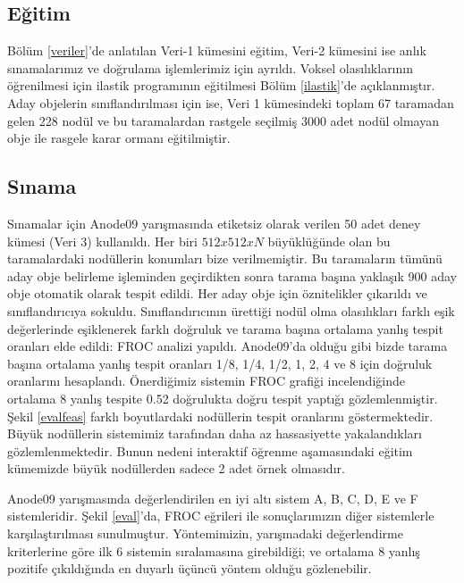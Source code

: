 \documentclass[conference]{IEEEtran}
\begin{document}
\subsection{Eğitim}
Bölüm \ref{veriler}'de anlatılan Veri-1 kümesini eğitim, Veri-2 kümesini ise anlık sınamalarımız ve doğrulama işlemlerimiz için ayrıldı. Voksel olasılıklarının öğrenilmesi için ilastik \cite{sommer2011} programının eğitilmesi Bölüm \ref{ilastik}'de açıklanmıştır. Aday objelerin sınıflandırılması için ise, Veri 1 kümesindeki toplam 67 taramadan gelen 228 nodül ve bu taramalardan rastgele seçilmiş 3000 adet nodül olmayan obje ile rasgele karar ormanı eğitilmiştir.

\subsection{Sınama}
Sınamalar için Anode09 yarışmasında etiketsiz olarak verilen 50 adet deney kümesi (Veri 3) kullanıldı. Her biri $512x512xN$ büyüklüğünde olan bu taramalardaki nodüllerin konumları bize verilmemiştir. Bu taramaların tümünü aday obje belirleme işleminden geçirdikten sonra tarama başına yaklaşık 900 aday obje otomatik olarak tespit edildi. Her aday obje için öznitelikler çıkarıldı ve sınıflandırıcıya sokuldu. Sınıflandırıcının ürettiği nodül olma olasılıkları farklı eşik değerlerinde eşiklenerek farklı doğruluk ve tarama başına ortalama yanlış tespit oranları elde edildi: FROC analizi yapıldı. Anode09\cite{anode09}'da olduğu gibi bizde tarama başına ortalama yanlış tespit oranları 1/8, 1/4, 1/2, 1, 2, 4 ve 8 için doğruluk oranlarını hesaplandı. Önerdiğimiz sistemin FROC grafiği incelendiğinde ortalama 8 yanlış tespite 0.52 doğrulukta doğru tespit yaptığı gözlemlenmiştir. Şekil \ref{evalfeas} farklı boyutlardaki nodüllerin tespit oranlarını göstermektedir. Büyük nodüllerin sistemimiz tarafından daha az hassasiyette yakalandıkları gözlemlenmektedir. Bunun nedeni interaktif öğrenme aşamasındaki eğitim kümemizde büyük nodüllerden sadece 2 adet örnek olmasıdır.

Anode09 yarışmasında değerlendirilen en iyi altı sistem A, B, C, D, E ve F sistemleridir. Şekil \ref{eval}'da, FROC eğrileri ile sonuçlarımızın diğer sistemlerle karşılaştırılması sunulmuştur. Yöntemimizin, yarışmadaki değerlendirme kriterlerine göre ilk 6 sistemin sıralamasına girebildiği; ve ortalama 8 yanlış pozitife çıkıldığında en duyarlı üçüncü yöntem olduğu gözlenebilir.
\end{document}
